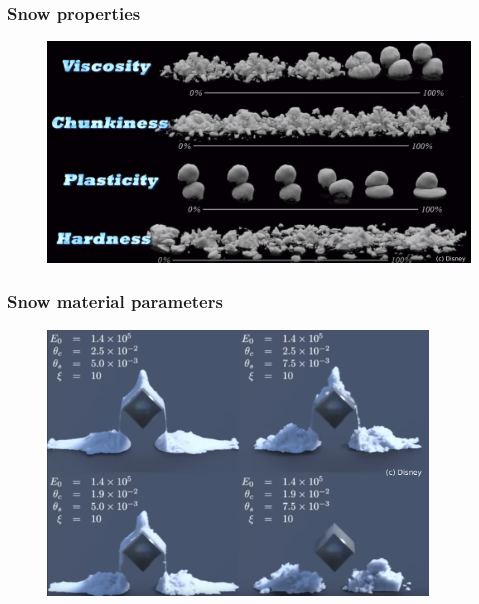 \documentclass[notes]{beamer}
\begin{document}
\begin{frame}
	\frametitle{Snow properties}
	\begin{figure}[ht]
		\centering
		\includegraphics[width=\textwidth]{figs/snow.png}
	\end{figure}
\end{frame}

\begin{frame}
	\frametitle{Snow material parameters}
	\begin{figure}[ht]
		\centering
		\includegraphics[width=0.9\textwidth]{figs/snow-parameters.png}
	\end{figure}
\end{frame}
\end{document}
